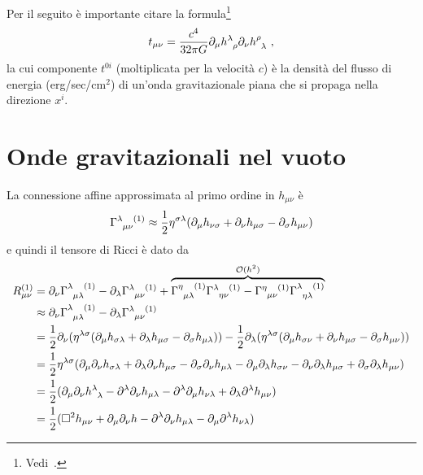 Per il seguito è importante citare la
formula\footnote{Vedi~\textcite[449]{landau:campi}.}
\begin{equation}
  \label{landau107,11}
  t_{\mu\nu} = \frac{c^{4}}{32\pi G} \partial_{\mu}
  \tensor{h}{^{\lambda}_{\rho}} \partial_{\nu} \tensor{h}{^{\rho}_{\lambda}} \ ,
\end{equation}
la cui componente $t^{0i}$ (moltiplicata per la velocità $c$) è la densità del
flusso di energia (erg/sec/cm$^2$) di un'onda gravitazionale piana che si
propaga nella direzione $x^{i}$.

\section{Onde gravitazionali nel vuoto}
\label{sec:onde-grav-vuoto}

La connessione affine approssimata al primo ordine in $h_{\mu\nu}$ è
\begin{equation}
  \tensor{\Gamma}{^{\lambda}_{\mu\nu}^{(1)}} \approx \frac{1}{2}\eta^{\sigma\lambda}
  (\partial_{\mu}h_{\nu\sigma} + \partial_{\nu}h_{\mu\sigma}
  - \partial_{\sigma}h_{\mu\nu})
\end{equation}
e quindi il tensore di Ricci è dato da
\begin{equation}
  \label{eq:ricci-lineare}
  \begin{split}
    R_{\mu\nu}^{(1)} &= \partial_{\nu}
    \tensor{\Gamma}{^{\lambda}_{\mu\lambda}^{(1)}}
    - \partial_{\lambda} \tensor{\Gamma}{^{\lambda}_{\mu\nu}^{(1)}} +
    \overbrace{\tensor{\Gamma}{^{\eta}_{\mu\lambda}^{(1)}}
      \tensor{\Gamma}{^{\lambda}_{\eta\nu}^{(1)}} -
      \tensor{\Gamma}{^{\eta}_{\mu\nu}^{(1)}}
      \tensor{\Gamma}{^{\lambda}_{\eta\lambda}^{(1)}}}^{\mathcal{O}(h^{2})} \\
    &\approx \partial_{\nu}\tensor{\Gamma}{^{\lambda}_{\mu\lambda}^{(1)}}
    - \partial_{\lambda} \tensor{\Gamma}{^{\lambda}_{\mu\nu}^{(1)}} \\
    &= \frac{1}{2}\partial_{\nu} (\eta^{\lambda\sigma}(\partial_{\mu}
    h_{\sigma\lambda} + \partial_{\lambda}h_{\mu\sigma}
    - \partial_{\sigma}h_{\mu\lambda})) -
    \frac{1}{2}\partial_{\lambda}(\eta^{\lambda\sigma}(\partial_{\mu}h_{\sigma\nu}
    + \partial_{\nu}h_{\mu\sigma} - \partial_{\sigma}h_{\mu\nu})) \\
    &= \frac{1}{2} \eta^{\lambda\sigma}(\partial_{\mu}\partial_{\nu}
    h_{\sigma\lambda} + \partial_{\lambda}\partial_{\nu} h_{\mu\sigma}
    - \partial_{\sigma}\partial_{\nu} h_{\mu\lambda}
    - \partial_{\mu}\partial_{\lambda} h_{\sigma\nu}
    - \partial_{\nu}\partial_{\lambda} h_{\mu\sigma}
    + \partial_{\sigma}\partial_{\lambda} h_{\mu\nu}) \\
    &= \frac{1}{2}(\partial_{\mu}\partial_{\nu}
    \tensor{h}{^{\lambda}_{\lambda}} - \partial^{\lambda}\partial_{\nu}
    h_{\mu\lambda} - \partial^{\lambda}\partial_{\mu} h_{\nu\lambda}
    + \partial_{\lambda}\partial^{\lambda} h_{\mu\nu}) \\
    &= \frac{1}{2} (\dalamb h_{\mu\nu} + \partial_{\mu}\partial_{\nu} h
    - \partial^{\lambda}\partial_{\nu} h_{\mu\lambda}
    - \partial_{\mu}\partial^{\lambda} h_{\nu\lambda})
  \end{split}
\end{equation}
